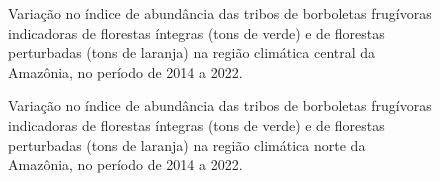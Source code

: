 \documentclass[
  letterpaper,
]{scrbook}
\begin{document}
\begin{figure}[H]


\caption{\label{fig-IA-areas-abertas-regiao-climatica-central-amazonica}Variação
no índice de abundância das tribos de borboletas frugívoras indicadoras
de florestas íntegras (tons de verde) e de florestas perturbadas (tons
de laranja) na região climática central da Amazônia, no período de 2014
a 2022.}

\end{figure}%

\begin{figure}[H]


\caption{\label{fig-IA-regiao-climatica-norte-amazonica}Variação no
índice de abundância das tribos de borboletas frugívoras indicadoras de
florestas íntegras (tons de verde) e de florestas perturbadas (tons de
laranja) na região climática norte da Amazônia, no período de 2014 a
2022.}

\end{figure}%
\end{document}
